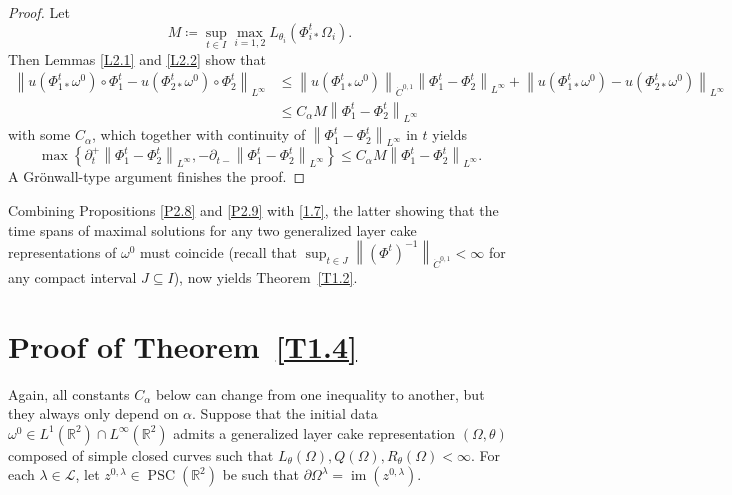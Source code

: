 \documentclass[reqno,centertags,12pt]{amsart}
\theoremstyle{definition}
\numberwithin{equation}{section}
\newcommand{\norm}[1]{\left\|#1\right\|}
\newcommand{\set}[1]{\left\{ #1 \right\}}
\newcommand{\bbR}{{\mathbb{R}}}
\newcommand{\tht}{\theta}
\begin{document}
\begin{proof}
    Let
    \[
        M \coloneqq \sup_{t\in I}\max_{i=1,2}L_{\theta_{i}}(\Phi_{i*}^{t}\Omega_{i}).
    \]
    Then Lemmas \ref{L2.1} and \ref{L2.2} show that
    \begin{align*}
        \norm{u(\Phi_{1*}^{t}\omega^{0})\circ \Phi_{1}^{t}
        - u(\Phi_{2*}^{t}\omega^{0})\circ \Phi_{2}^{t}}_{L^{\infty}}
        &\leq \norm{u(\Phi_{1*}^{t}\omega^{0})}_{\dot{C}^{0,1}}
        \norm{\Phi_{1}^{t} - \Phi_{2}^{t}}_{L^{\infty}}
        + \norm{u(\Phi_{1*}^{t}\omega^{0}) - u(\Phi_{2*}^{t}\omega^{0})}_{L^{\infty}} \\
        &\leq C_{\alpha}M\norm{\Phi_{1}^{t} - \Phi_{2}^{t}}_{L^{\infty}}
    \end{align*}
    with some $C_{\alpha}$, which together with continuity of
    $\norm{\Phi_{1}^{t}-\Phi_{2}^{t}}_{L^{\infty}}$ in $t$ yields
    \[
        \max\set{
            \partial_{t}^{+}\norm{\Phi_{1}^{t} - \Phi_{2}^{t}}_{L^{\infty}},
            -\partial_{t-}\norm{\Phi_{1}^{t} - \Phi_{2}^{t}}_{L^{\infty}}
        }
        \leq C_{\alpha}M\norm{\Phi_{1}^{t} - \Phi_{2}^{t}}_{L^{\infty}}.
    \]
  A Gr\"{o}nwall-type argument  finishes the proof.
\end{proof}

Combining Propositions \ref{P2.8} and \ref{P2.9} with \eqref{1.7}, the latter showing that the time spans of maximal solutions for
any two generalized layer cake representations of $\omega^{0}$ must coincide (recall that
$\sup_{t\in J}\norm{(\Phi^{t})^{-1}}_{\dot{C}^{0,1}} < \infty$ for any compact interval $J\subseteq I$),
now yields  Theorem~\ref{T1.2}.



\section{Proof of Theorem~\ref{T1.4}}\label{S3}

Again, all constants $C_{\alpha}$ below
can change from one inequality to another, but they always only depend  on $\alpha$.
Suppose that the initial data $\omega^{0}\in L^{1}(\bbR^{2})\cap L^{\infty}(\bbR^{2})$
admits a generalized layer cake representation $(\Omega,\theta)$
composed of simple closed curves such that $L_{\tht}(\Omega), Q(\Omega), R_{\tht}(\Omega) < \infty$.
For each $\lambda\in\mathcal{L}$, let $z^{0,\lambda}\in\operatorname{PSC}(\bbR^{2})$ be
such that $\partial\Omega^{\lambda} = \operatorname{im}(z^{0,\lambda})$.
\end{document}
